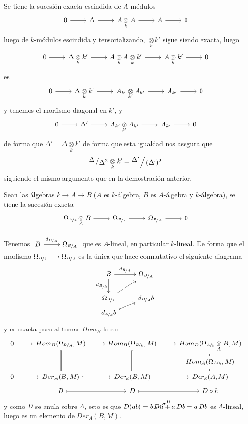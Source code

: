 \begin{dem}
    Se tiene la sucesi\'on exacta escindida de $A$-m\'odulos 
    $$\bt 0\rar &  \Delta \rar & A \underset{k}{\otimes} A \rar &  A \rar & 0\et$$
    luego de $k$-m\'odulos escindida y tensorializando, $\underset{k}{\otimes} k'$ sigue siendo exacta, luego
    $$\bt 0\rar &  \Delta \underset{k}{\otimes} k' \rar & A \underset{k}{\otimes} A\underset{k}{\otimes} k' \rar &  A\underset{k}{\otimes} k' \rar & 0\et$$
    es 
    $$\bt 0\rar & \Delta \underset{k}{\otimes} k' \rar & A_{k'} \underset{k'}{\otimes} A_{k'}  \rar &  A_{k'} \rar & 0\et$$
    y tenemos el morfismo diagonal en $k'$, y 
    $$\bt 0\rar &  \Delta' \rar & A_{k'} \underset{k'}{\otimes} A_{k'}  \rar &  A_{k'} \rar & 0\et$$
    de forma que $\Delta' = \Delta \underset{k}{\otimes} k'$ de forma que esta igualdad nos asegura que $$\modulo{\Delta}{\Delta^2} \underset{k}{\otimes} k' = \modulo{\Delta'}{(\Delta')^2}$$
    siguiendo el mismo argumento que en la demostraci\'on anterior. 
\end{dem}
\begin{custom} Sean las \'algebras $k \longrightarrow A \longrightarrow B$ ($A$ es $k$-\'algebra, $B$ es $A$-\'algebra y $k$-\'algebra), se tiene la sucesi\'on exacta
    $$\bt  \Omega_{\nicefrac{A}{k}} \underset{A}{\otimes} B \rar & \Omega_{\nicefrac{B}{k}} \rar &  \Omega_{\nicefrac{B}{A}} \rar & 0\et$$
\end{custom}
\begin{dem}
    Tenemos $\bt B \rar{d_{\nicefrac{B}{A}}} & \Omega_{\nicefrac{B}{A}} \et$ que es $A$-lineal, en particular $k$-lineal. De forma que el morfismo $ \Omega_{\nicefrac{B}{k}} \longrightarrow  \Omega_{\nicefrac{B}{A}}$ es la \'unica que hace conmutativo el siguiente diagrama
    $$\bt B \rar{d_{\nicefrac{B}{A}}}  \arrow[swap]{d}{d_{\nicefrac{B}{k}}} & \Omega_{\nicefrac{B}{A}} \\ \Omega_{\nicefrac{B}{k}} \arrow{ru} & d_{\nicefrac{B}{A}}b \\[-5mm] d_{\nicefrac{B}{k}} b \arrow[mapsto]{ru}  \et$$
    y es exacta pues al tomar $Hom_B$ lo es:
    $$\bt 0 \rar & Hom_B(\Omega_{\nicefrac{B}{A}}, M) \rar &  Hom_B(\Omega_{\nicefrac{B}{k}}, M) \rar &  Hom_B(\Omega_{\nicefrac{A}{k}} \underset{A}{\otimes} B, M) \\[-5mm] 
    & & & Hom_A(\Omega_{\nicefrac{A}{k}}, M )\arrow[equal]{u} \\[-5mm] 
    0 \rar & Der_A(B, M) \arrow[equal]{uu}  \rar[hook]  & Der_k(B, M) \arrow{r} \arrow[equal]{uu} & Der_k(A, M) \arrow[equal]{u} \\[-5mm] 
    & D \rarmaps & D \arrow[mapsto]{r} & D \circ h  \et$$
    y como $D$ se anula sobre $A$, esto es que $D(ab) = b \, \cancelto{0}{Da}+ a \, Db = a \,Db$ es $A$-lineal, luego es un elemento de $Der_A(B,M)$. 
\end{dem}
